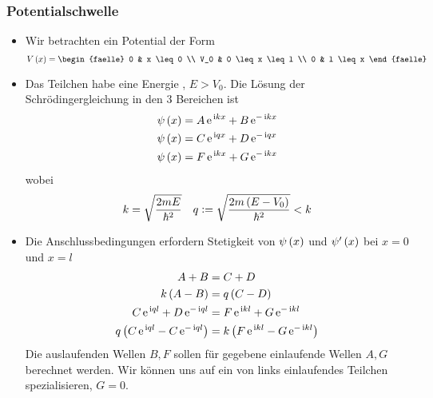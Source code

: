 \subsubsection{Potentialschwelle}
\begin{itemize}
  \item Wir betrachten ein Potential der Form 
  \begin{equation}
    V\of{x} = \begin{faelle} 0 & x \leq 0 \\ V_0 & 0 \leq x \leq l \\ 0 & l \leq x \end{faelle}
  \end{equation}
  \begin{figure}[H]
    \centering
    
  \end{figure}
  \item {} Das Teilchen habe eine Energie , $E > V_0$. Die Lösung der Schrödingergleichung in den $3$ Bereichen ist
  \begin{align}
    \psi\left(x\right) & = A \, \text{e}^{\, \text{i} k x} + B \, \text{e}^{-\, \text{i} k x} \\
    \psi\left(x\right) & = C \, \text{e}^{\, \text{i} q x} + D \, \text{e}^{-\, \text{i} q x} \\
    \psi\left(x\right) & = F \, \text{e}^{\, \text{i} k x} + G \, \text{e}^{-\, \text{i} k x}
  \end{align}
  wobei
  \begin{equation}
    k = \sqrt{\frac{2mE}{\hbar^2}} \quad q \vcentcolon = \sqrt{\frac{2m\left(E-V_0\right)}{\hbar^2}} < k
  \end{equation}
  \begin{figure}[H]
    \centering
    
  \end{figure}
  \item Die Anschlussbedingungen erfordern Stetigkeit von $\psi\left(x\right)$ und $\psi'\left(x\right)$ bei $x = 0$ und $x = l$
  \begin{align}
    A + B & = C + D \\
    k\left(A - B\right) & = q \left(C - D\right) \\
    C \, \text{e}^{\, \text{i} q l} + D \, \text{e}^{-\, \text{i} q l} & = F \, \text{e}^{\, \text{i} k l} + G \, \text{e}^{-\, \text{i} k l} \\
    q\left(C \, \text{e}^{\, \text{i} q l} - C \, \text{e}^{-\, \text{i} q l}\right) & = k\left(F \, \text{e}^{\, \text{i} k l} - G \, \text{e}^{-\, \text{i} k l}\right)
  \end{align}
  Die auslaufenden Wellen $B, F$ sollen für gegebene einlaufende Wellen $A,G$ berechnet werden. Wir können uns auf ein von links einlaufendes Teilchen spezialisieren, $G = 0$. \\

\end{itemize}
